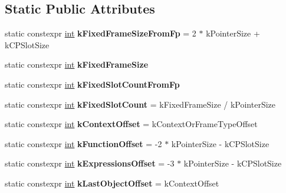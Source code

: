 \subsection*{Static Public Attributes}
\begin{DoxyCompactItemize}
\item 
\mbox{\label{classv8_1_1internal_1_1StandardFrameConstants_a33acb6761fb2cd5a432472aceaf6a385}} 
static constexpr \mbox{\hyperlink{classint}{int}} {\bfseries k\+Fixed\+Frame\+Size\+From\+Fp} = 2 $\ast$ k\+Pointer\+Size + k\+C\+P\+Slot\+Size
\item 
static constexpr \mbox{\hyperlink{classint}{int}} {\bfseries k\+Fixed\+Frame\+Size}
\item 
static constexpr \mbox{\hyperlink{classint}{int}} {\bfseries k\+Fixed\+Slot\+Count\+From\+Fp}
\item 
\mbox{\label{classv8_1_1internal_1_1StandardFrameConstants_a3bd3575cabe8b50d74dfdd77c278746f}} 
static constexpr \mbox{\hyperlink{classint}{int}} {\bfseries k\+Fixed\+Slot\+Count} = k\+Fixed\+Frame\+Size / k\+Pointer\+Size
\item 
\mbox{\label{classv8_1_1internal_1_1StandardFrameConstants_a20ba1d1c4c4bbd86851bcb4c6f798021}} 
static constexpr \mbox{\hyperlink{classint}{int}} {\bfseries k\+Context\+Offset} = k\+Context\+Or\+Frame\+Type\+Offset
\item 
\mbox{\label{classv8_1_1internal_1_1StandardFrameConstants_a9732f9f43cfed9ce85f3ff9ca920dc82}} 
static constexpr \mbox{\hyperlink{classint}{int}} {\bfseries k\+Function\+Offset} = -\/2 $\ast$ k\+Pointer\+Size -\/ k\+C\+P\+Slot\+Size
\item 
\mbox{\label{classv8_1_1internal_1_1StandardFrameConstants_a16e313ff143f71038776e2ec33169faf}} 
static constexpr \mbox{\hyperlink{classint}{int}} {\bfseries k\+Expressions\+Offset} = -\/3 $\ast$ k\+Pointer\+Size -\/ k\+C\+P\+Slot\+Size
\item 
\mbox{\label{classv8_1_1internal_1_1StandardFrameConstants_a88622b7c21be1cd8f87663cc2252b81a}} 
static constexpr \mbox{\hyperlink{classint}{int}} {\bfseries k\+Last\+Object\+Offset} = k\+Context\+Offset
\end{DoxyCompactItemize}


